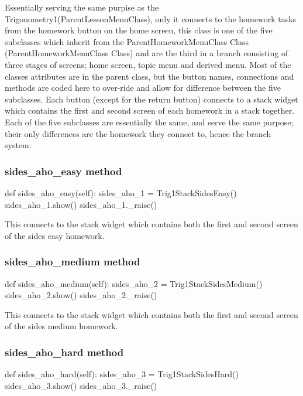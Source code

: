 Essentially serving the same purpise as the Trigonometry1(ParentLessonMenuClass), only it connects to the homework tasks from the homework button on the home screen, this class is one of the five subclasses which inherit from the ParentHomeworkMenuClass Class (ParentHomeworkMenuClass Class) and are the third in a branch consisting of three stages of screens; home screen, topic menu and derived menu. Most of the classes attributes are in the parent class, but the button names, connections and methods are coded here to over-ride and allow for difference between the five subclasses. Each button (except for the return button) connects to a stack widget which contains the first and second screen of each homework in a stack together. Each of the five subclasses are essentially the same, and serve the same purpose; their only differences are the homework they connect to, hence the branch system.

\subsubsection{sides\_aho\_easy method}

\begin{python}
def sides_aho_easy(self):
        sides_aho_1 = Trig1StackSidesEasy()
        sides_aho_1.show()
        sides_aho_1._raise()
\end{python}

This connects to the stack widget which contains both the first and second screen of the sides easy homework.

\subsubsection{sides\_aho\_medium method}

\begin{python}
def sides_aho_medium(self):
        sides_aho_2 = Trig1StackSidesMedium()
        sides_aho_2.show()
        sides_aho_2._raise()
\end{python}

This connects to the stack widget which contains both the first and second screen of the sides medium homework.

\subsubsection{sides\_aho\_hard method}

\begin{python}
def sides_aho_hard(self):
        sides_aho_3 = Trig1StackSidesHard()
        sides_aho_3.show()
        sides_aho_3._raise()
\end{python}

